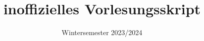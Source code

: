 \documentclass[german, parskip=full, 12pt]{article}
\begin{document}
\title{\vspace{3cm}
\titel \\
\vspace{2cm}
 \Large inoffizielles Vorlesungsskript
 \vspace{5cm}
 }


\author{\betreuer}
\date{Wintersemester 2023/2024}



\maketitle
\newpage

\tableofcontents
\newpage










\end{document}
